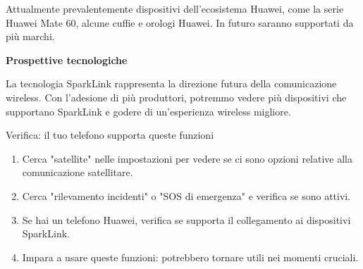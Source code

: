 Attualmente prevalentemente dispositivi dell'ecosistema Huawei, come la serie Huawei Mate 60, alcune cuffie e orologi Huawei. In futuro saranno supportati da più marchi.

\textbf{Prospettive tecnologiche}\par

La tecnologia SparkLink rappresenta la direzione futura della comunicazione wireless. Con l'adesione di più produttori, potremmo vedere più dispositivi che supportano SparkLink e godere di un'esperienza wireless migliore.

\begin{tcbpractice}{Verifica: il tuo telefono supporta queste funzioni}
\begin{enumerate}
  \item Cerca "satellite" nelle impostazioni per vedere se ci sono opzioni relative alla comunicazione satellitare.
  \item Cerca "rilevamento incidenti" o "SOS di emergenza" e verifica se sono attivi.
  \item Se hai un telefono Huawei, verifica se supporta il collegamento ai dispositivi SparkLink.
  \item Impara a usare queste funzioni: potrebbero tornare utili nei momenti cruciali.
\end{enumerate}

\end{tcbpractice}
